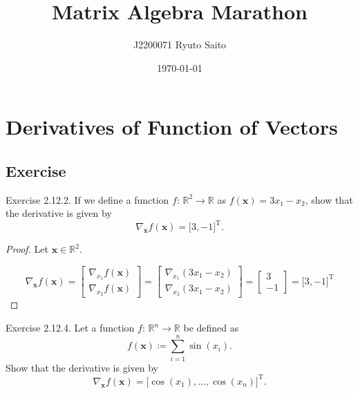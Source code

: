 \documentclass{article}
\title{Matrix Algebra Marathon}
\author{J2200071 Ryuto Saito}
\date{\today}
\theoremstyle{plain}
\begin{document}
\maketitle

\section{Derivatives of Function of Vectors}

\subsection{Exercise}

\begin{itembox}[l]{Exercise 2.12.2.}
	If we define a function $f$: $\mathbb{R}^2 \rightarrow \mathbb{R}$ as $f(\bm{x}) = 3 x_1 - x_2$,
	show that the derivative is given by
	\begin{equation}
		\nabla_{\bm{x}} f(\bm{x}) = \lbrack 3 , -1 \rbrack^{\mathrm{T}} .
	\end{equation}
\end{itembox}

\begin{proof}
	Let
	\begin{math}
		\bm{x} \in \mathbb{R}^2 .
	\end{math}
	
	\begin{equation*}
		\nabla_{\bm{x}} f(\bm{x}) =
		\begin{bmatrix}
			\nabla_{x_1} f(\bm{x}) \\
			\nabla_{x_2} f(\bm{x})
		\end{bmatrix}
		=
		\begin{bmatrix}
			\nabla_{x_1} (3 x_1 - x_2) \\
			\nabla_{x_2} (3 x_1 - x_2)
		\end{bmatrix}
		=
		\begin{bmatrix}
			3 \\
			-1
		\end{bmatrix}
		=
		\lbrack 3 , -1 \rbrack^{\mathrm{T}}
	\end{equation*}
\end{proof}

\begin{itembox}[l]{Exercise 2.12.4.}
	Let a function $f$: $\mathbb{R}^n \rightarrow \mathbb{R}$ be defined as
	\begin{equation}
		\label{f2124}
		f(\bm{x}) \coloneq \sum_{i=1}^n \sin(x_i) .
	\end{equation}
	Show that the derivative is given by
	\begin{equation}
		\nabla_{\bm{x}} f(\bm{x}) = \lbrack \cos(x_1) , \ldots , \cos(x_n) \rbrack^\mathrm{T} .
	\end{equation}
\end{itembox}
\end{document}
